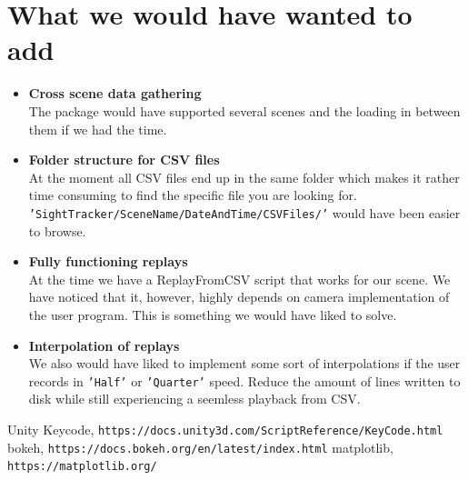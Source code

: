 \documentclass[letterpaper]{article}
\begin{document}
\section{What we would have wanted to add}
\begin{itemize}
\item \textbf{Cross scene data gathering}\\
The package would have supported several scenes and the loading in between them if we had the time.
\item \textbf{Folder structure for CSV files}\\
At the moment all CSV files end up in the same folder which makes it rather time consuming to find the specific file you are looking for.\\
\texttt{'SightTracker/SceneName/DateAndTime/CSVFiles/'} would have been easier to browse.
\item \textbf{Fully functioning replays}\\
At the time we have a ReplayFromCSV script that works for our scene. We have noticed that it, however, highly depends on camera implementation of the user program. This is something we would have liked to solve.
\item \textbf{Interpolation of replays}\\
We also would have liked to implement some sort of interpolations if the user records in \texttt{'Half'} or \texttt{'Quarter'} speed. Reduce the amount of lines written to disk while still experiencing a seemless playback from CSV.
\end{itemize}
\newpage
\begin{thebibliography}{9}
Unity Keycode,
\texttt{https://docs.unity3d.com/ScriptReference/KeyCode.html}
bokeh, 
\texttt{https://docs.bokeh.org/en/latest/index.html}
matplotlib,
\texttt{https://matplotlib.org/}

\end{thebibliography}
\end{document}
